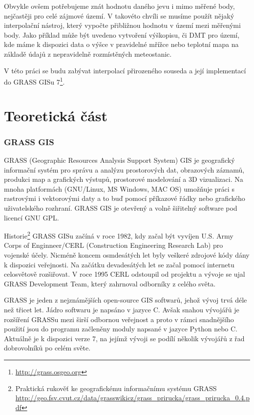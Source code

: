 \documentclass[12pt,a4paper]{article}
\begin{document}
Obvykle ovšem potřebujeme znát hodnotu daného jevu i mimo měřené body, nejčastěji pro celé zájmové území. V takovéto chvíli se musíme použít nějaký interpolační nástroj, který vypočte přibližnou hodnotu v území mezi měřenými body. Jako příklad může být uvedeno vytvoření výškopisu, či DMT pro území, kde máme k dispozici data o výšce v pravidelné mřížce nebo teplotní mapa na základě údajů z nepravidelně rozmístěných meteostanic.

V této práci se budu zabývat interpolací přirozeného souseda a její implementací do GRASS GISu 7\footnote{\url{http://grass.osgeo.org}}. 

\newpage
\part{Teoretická část}

\newpage
\section{GRASS GIS}
GRASS (Geographic Resources Analysis Support System) GIS je geografický informační systém pro správu a analýzu prostorových dat, obrazových záznamů, produkci map a grafických výstupů, prostorové modelování a 3D vizualizaci. Na mnoha platformách (GNU/Linux, MS Windows, MAC OS) umožňuje práci s rastrovými i vektorovými daty a to buď pomocí příkazové řádky nebo grafického uživatelského rozhraní. GRASS GIS je otevřený a volně šiřitelný software pod licencí GNU GPL.

Historie\footnote{Praktická rukověť ke geografickému informačnímu systému GRASS \url{http://geo.fsv.cvut.cz/data/grasswikicz/grass_prirucka/grass_prirucka_0.4.pdf}} GRASS GISu začíná v roce 1982, kdy začal být vyvíjen U.S. Army Corps of Enginneer/CERL (Construction Engineering Research Lab) pro vojenské účely. Nicméně koncem osmdesátých let byly veškeré zdrojové kódy dány k dispozici veřejnosti. Na začátku devadesátých let se začal pomocí internetu celosvětově rozšiřovat. V roce 1995 CERL odstoupil od projektu a vývoje se ujal GRASS Development Team, který zahrnoval odborníky z celého světa.

GRASS je jeden z nejznámějších open-source GIS softwarů, jehož vývoj trvá déle než třicet let. Jádro softwaru je napsáno v jazyce C. Avšak snahou vývojářů je rozšíření GRASSu mezi širší odbornou veřejnost a proto v rámci snadnějšího použití jsou do programu začleněny moduly napsané v jazyce Python nebo C. Aktuálně je k dispozici verze 7, na jejímž vývoji se podílí několik vývojářů z řad dobrovolníků po celém světe.
\end{document}
